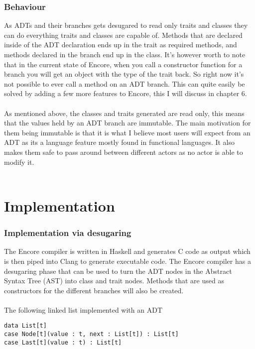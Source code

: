 \documentclass[10pt]{report}
\begin{document}
\subsection{Behaviour}
As ADTs and their branches gets desugared to read only traits and classes they can do everything traits and classes are capable of.
Methods that are declared inside of the ADT declaration ends up in the trait as required methods, and methods declared in the branch end up in the class. It's however worth to note that in the current state of Encore, when you call a constructor function for a branch you will get an object with the type of the trait back. So right now it's not possible to ever call a method on an ADT branch. This can quite easily be solved by adding a few more features to Encore, this I will discuss in chapter 6.
\\\\As mentioned above, the classes and traits generated are read only, this means that the values held by an ADT branch are immutable.  The main motivation for them being immutable is that it is what I believe most users will expect from an ADT as its a language feature mostly found in functional languages. It also makes them safe to pass around between different actors as no actor is able to modify it.\\\\
\chapter{Implementation}

\subsection{Implementation via desugaring}
The Encore compiler is written in Haskell and generates C code as output which is then piped into Clang to generate executable code. The Encore compiler has a desugaring phase that can be used to turn the ADT nodes in the Abstract Syntax Tree (AST) into class and trait nodes. Methods that are used as constructors for the different branches will also be created.\\\\
The following linked list implemented with an ADT

\begin{lstlisting}[language=encore,caption={Linked list before it has been desugared}]
data List[t]
case Node[t](value : t, next : List[t]) : List[t]
case Last[t](value : t) : List[t]
\end{lstlisting}
\end{document}

